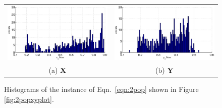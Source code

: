\documentclass{article}[10pt]
\begin{document}
\begin{figure}[ht]
\begin{tabular}{cc}
\includegraphics[scale=0.5]{CoupLogMapExample_Xhist.eps} & \includegraphics[scale=0.5]{CoupLogMapExample_Yhist.eps} \\
(a) $\mathbf{X}$ & (b) $\mathbf{Y}$
\end{tabular}
\caption{Histograms of the instance of Eqn.\ \ref{eqn:2pop} shown in Figure \ref{fig:2popxyplot}.}
\label{fig:2popxyhist}
\end{figure}
\end{document}
